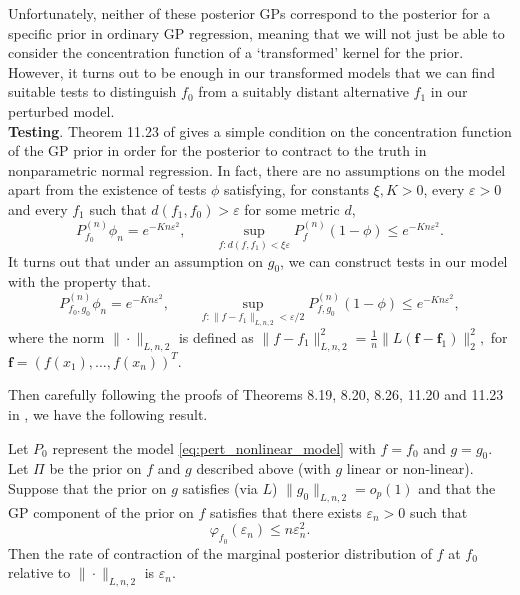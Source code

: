 \documentclass[11pt]{article}
\newcommand{\subparspace}{\vspace{3mm} \\}
\newcommand{\eps}{\varepsilon}
\numberwithin{equation}{section}
\begin{document}
Unfortunately, neither of these posterior GPs correspond to the posterior for a specific prior in ordinary GP regression, meaning that we will not just be able to consider the concentration function of a `transformed' kernel for the prior. However, it turns out to be enough in our transformed models that we can find suitable tests to distinguish $f_0$ from a suitably distant alternative $f_1$ in our perturbed model.
\subparspace
{\textbf{Testing}. } Theorem 11.23 of \cite{FNBI} gives a simple condition on the concentration function of the GP prior in order for the posterior to contract to the truth in nonparametric normal regression. In fact, there are no assumptions on the model apart from the existence of tests $\phi$ satisfying, for constants $\xi, K > 0$, every $\eps > 0$ and every $f_1$ such that $d(f_1, f_0) > \eps$ for some metric $d$,
\begin{equation*}
	P_{f_0}^{(n)} \phi_n = e^{-Kn\eps^2}, \qquad \sup_{f : d(f, f_1) < \xi \eps} P_f^{(n)} (1-\phi) \leq e^{-Kn\eps^2}.
\end{equation*}
It turns out that under an assumption on $g_0$, we can construct tests in our model with the property that.
\begin{equation*}
	P_{f_0, g_0}^{(n)} \phi_n = e^{-Kn\eps^2}, \qquad \sup_{f : \|f - f_1\|_{L,n,2} < \eps/2} P_{f, g_0}^{(n)} (1-\phi) \leq e^{-Kn\eps^2},
\end{equation*}
where the norm $\|\cdot\|_{L, n, 2}$ is defined as
$
\|f - f_1\|^2_{L,n,2} = \frac{1}{n}\|L(\mathbf{f} - \mathbf{f}_1)\|_2^2,
$
for $\mathbf{f} = (f(x_1), \dots, f(x_n))^T$.

Then carefully following the proofs of Theorems 8.19, 8.20, 8.26, 11.20 and 11.23 in \cite{FNBI}, we have the following result.
\begin{theorem}\label{thm:gp_contraction}
	Let $P_0$ represent the model \eqref{eq:pert_nonlinear_model} with $f = f_0$ and $g = g_0$. Let $\Pi$ be the prior on $f$ and $g$ described above (with $g$ linear or non-linear).
	{\color{red} Suppose that the prior on $g$ satisfies (via $L$) $\| g_0\|_{L, n, 2} = o_p(1)$} and that the GP component of the prior on $f$ satisfies that there exists $\eps_n >0$ such that
	$$
	\varphi_{f_0}(\eps_n) \leq n\eps_n^2. 
	$$
	Then the rate of contraction of the marginal posterior distribution of $f$ at $f_0$ relative to $\| \cdot\|_{L,n,2}$ is $\eps_n$. 
	 \end{theorem}
	 
\end{document}
